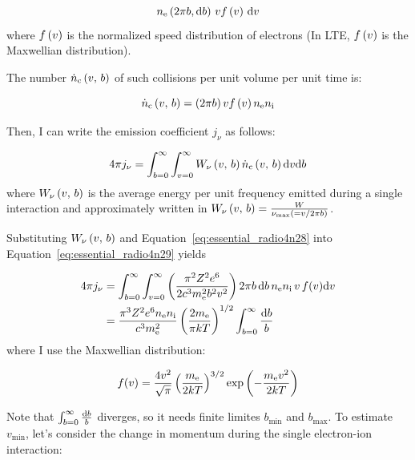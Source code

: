 \begin{equation}\label{eq:essential_radio4n27}
    n_{\mathrm{e}} \left(2\pi b,\mathrm{d} b\right)\,v f\left(v\right)\,\mathrm{d} v
\end{equation}
where $f\left(v\right)$ is the normalized speed distribution of electrons (In LTE, $f\left(v\right)$ is the Maxwellian distribution).

The number $\dot{n}_{\mathrm{c}}\left(v,\,b\right)$ of such collisions per unit volume per unit time is:

\begin{equation}\label{eq:essential_radio4n28}
    \dot{n}_{\mathrm{c}}\left(v,\,b\right) = \left(2\pi b\right) v f\left(v\right) n_{\mathrm{e}} n_{\mathrm{i}}
\end{equation}

Then, I can write the emission coefficient $j_{\nu}$ as follows:

\begin{equation}\label{eq:essential_radio4n29}
    4 \pi j_{\nu}=\int_{b=0}^{\infty} \int_{v=0}^{\infty} W_{\nu}\left(v,\,b\right) \dot{n}_{\mathrm{c}}\left(v,\,b\right) \mathrm{d} v \mathrm{d} b
\end{equation}
where $W_{\mathrm{\nu}}\left(v,\,b\right)$ is the average energy per unit frequency emitted during a single interaction and approximately written in $W_{\mathrm{\nu}}\left(v,\,b\right) = \frac{W}{\nu_{\mathrm{\max}} \left(= v/2\pi b\right)}$.

Substituting $W_{\mathrm{\nu}}\left(v,\,b\right)$ and Equation~\ref{eq:essential_radio4n28} into Equation~\ref{eq:essential_radio4n29} yields

\begin{align}
    4 \pi j_{\nu} &= \int_{b=0}^{\infty} \int_{v=0}^{\infty} \left(\frac{\pi^2 Z^2 e^6}{2 c^3 m_{\mathrm{e}}^2 b^2 v^2}\right) 2 \pi b\,\mathrm{d} b\,n_{\mathrm{e}} n_{\mathrm{i}}\,v\,f(v) \mathrm{d} v \label{eq:essential_radio4n30}\\
                  &=\frac{\pi^{3} Z^{2} e^{6} n_{\mathrm{e}} n_{\mathrm{i}}}{c^{3} m_{\mathrm{e}}^{2}} \left(\frac{2m_{\mathrm{e}}}{\pi k T}\right)^{1/2}\int_{b=0}^{\infty} \frac{\mathrm{d} b}{b}\label{eq:essential_radio4n31}
\end{align}
where I use the Maxwellian distribution:

\begin{equation}\label{eq:essential_radio4n34}
    f(v)=\frac{4 v^2}{\sqrt{\pi}} \left(\frac{m_{\mathrm{e}}}{2 k T}\right)^{3/2} \exp \left(-\frac{m_{\mathrm{e}} v^2}{2 k T}\right)
\end{equation}

Note that $\int^{\infty}_{b=0} \frac{\mathrm{d} b}{b}$ diverges, so it needs finite limites $b_{\min}$ and $b_{\max}$.
To estimate $v_{\min}$, let's consider the change in momentum during the single electron-ion interaction:

